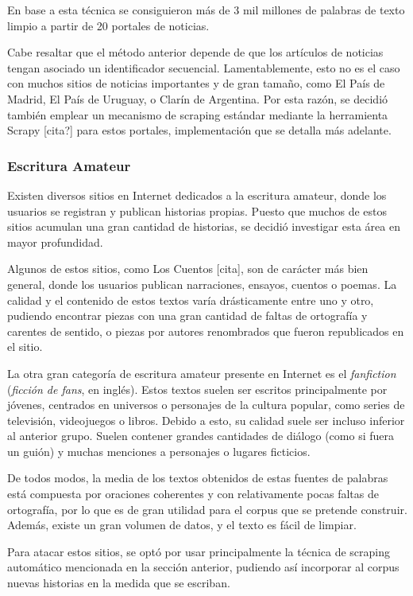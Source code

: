 En base a esta técnica se consiguieron más de 3 mil millones de palabras de texto limpio a partir de
20 portales de noticias.


Cabe resaltar que el método anterior depende de que los artículos de noticias tengan asociado un
identificador secuencial. Lamentablemente, esto no es el caso con muchos sitios de noticias
importantes y de gran tamaño, como El País de Madrid, El País de Uruguay, o Clarín de Argentina. Por
esta razón, se decidió también emplear un mecanismo de scraping estándar mediante la herramienta
Scrapy [cita?] para estos portales, implementación que se detalla más adelante.


\subsubsection{Escritura Amateur}

Existen diversos sitios en Internet dedicados a la escritura amateur, donde los usuarios se
registran y publican historias propias. Puesto que muchos de estos sitios acumulan una gran cantidad
de historias, se decidió investigar esta área en mayor profundidad.

Algunos de estos sitios, como Los Cuentos [cita], son de carácter más bien general, donde los
usuarios publican narraciones, ensayos, cuentos o poemas. La calidad y el contenido de estos textos
varía drásticamente entre uno y otro, pudiendo encontrar piezas con una gran cantidad de faltas de
ortografía y carentes de sentido, o piezas por autores renombrados que fueron republicados en el
sitio.

La otra gran categoría de escritura amateur presente en Internet es el \textit{fanfiction}
(\textit{ficción de fans}, en inglés). Estos textos suelen ser escritos principalmente por jóvenes,
centrados en universos o personajes de la cultura popular, como series de televisión, videojuegos o
libros. Debido a esto, su calidad suele ser incluso inferior al anterior grupo. Suelen contener
grandes cantidades de diálogo (como si fuera un guión) y muchas menciones a personajes o lugares
ficticios.

De todos modos, la media de los textos obtenidos de estas fuentes de palabras está compuesta por
oraciones coherentes y con relativamente pocas faltas de ortografía, por lo que es de gran utilidad
para el corpus que se pretende construir. Además, existe un gran volumen de datos, y el texto es
fácil de limpiar.

Para atacar estos sitios, se optó por usar principalmente la técnica de scraping automático
mencionada en la sección anterior, pudiendo así incorporar al corpus nuevas historias en la medida
que se escriban.


